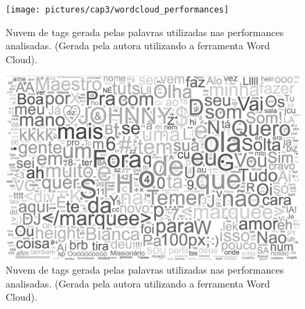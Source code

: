 
\begin{figure}[ht!]

\texttt{[image: pictures/cap3/wordcloud\_performances]}
\caption{Nuvem de tags gerada pelas palavras utilizadas nas performances analisadas. (Gerada pela autora utilizando a ferramenta Word Cloud).}
\label{fig:clouds}
\end{figure}

\begin{figure}[ht!]

\includegraphics[width=1\linewidth]{pictures/cap3/wordcloud_pb}
\caption{Nuvem de tags gerada pelas palavras utilizadas nas performances analisadas. (Gerada pela autora utilizando a ferramenta Word Cloud).}
\label{fig:cloud}
\end{figure}

